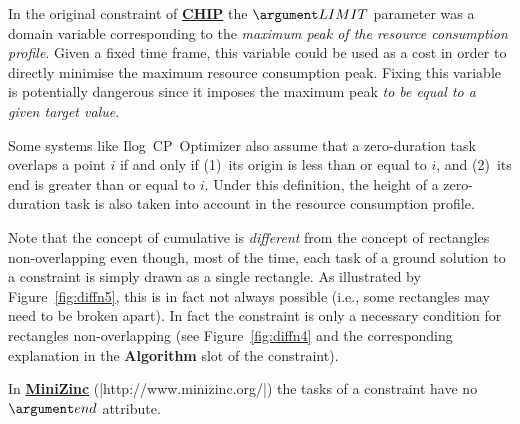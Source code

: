 \begin{ctrdesc}
\item[\pdfmarkup{subject={Remark},color=white,markup=Highlight}{Remark}{Miscellaneous comments about the constraint that do not fit in the other slots.}]
In the original  constraint of
\href{http://www.cosytec.com}{{\bf CHIP}}
the $\MLIMIT$
parameter was a domain variable corresponding to the
\emph{maximum peak of the resource consumption profile}.
Given a fixed time frame,
this variable could be used as a cost
in order to directly minimise the maximum resource consumption peak.
Fixing this variable is potentially dangerous since it imposes
the maximum peak \emph{to be equal to a given target value}\marginpar{\bcdz}.

Some systems like Ilog~CP~Optimizer also
assume that a zero\nobreakdash-duration task overlaps a point $i$ if and only if
(1)~its origin is less than or equal to $i$, and
(2)~its end is greater than or equal to $i$.
Under this definition, the height of a zero\nobreakdash-duration task is also taken into account in the
resource consumption profile.

Note that the concept of cumulative is \emph{different} from the concept of rectangles non\nobreakdash-overlapping\marginpar{\bcdz}
even though, most of the time, each task of a ground solution to a  constraint is simply drawn as a single
rectangle. As illustrated by Figure~\ref{fig:diffn5}, this is in fact not always possible (i.e., some rectangles may need to be
broken apart). In fact the  constraint is only a necessary condition for rectangles
non\nobreakdash-overlapping (see Figure~\ref{fig:diffn4} and the corresponding explanation in the {\bf Algorithm} slot of
the \hyperlink{Cdiffn}{} constraint).

In \href{http://www.minizinc.org/}{{\bf MiniZinc}} ({\footnotesize \path|http://www.minizinc.org/|})
the tasks of a  constraint have no $\Mend$ attribute.


\end{ctrdesc}
